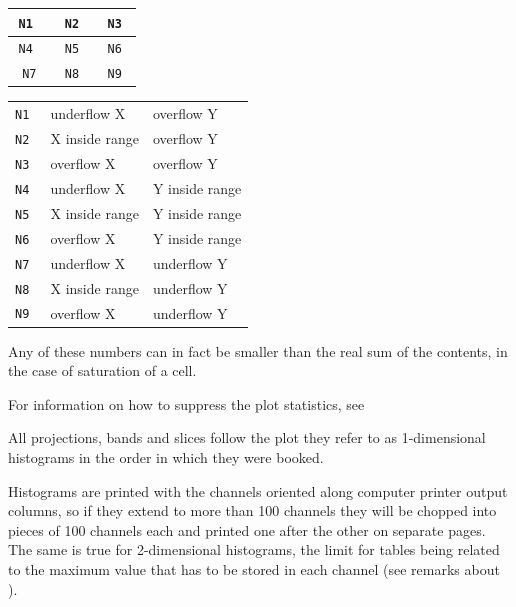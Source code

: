 \begin{minipage}{.44\textwidth}
\def\Rule{\rule[1.5ex]{0cm}{6ex}}
\begin{center}
\begin{tabular}{@{\qquad}>{\tt}c|@{\qquad}>{\tt}c@{\qquad}|>{\tt}c@{\qquad}}
      N1  &   N2   &  N3 \\ \hline
      N4  &   N5   &  N6 \\ \hline
      N7  &   N8   &  N9 
\end{tabular}
\end{center}
\end{minipage}\hfill
\begin{minipage}{.55\textwidth}
\begin{tabular}{>{\tt}l@{\quad=\quad}l@{\quad,\quad}l}
 N1   & underflow X      & overflow Y     \\
 N2   & X inside range   & overflow Y     \\
 N3   & overflow X       & overflow Y     \\
 N4   & underflow X      & Y inside range \\
 N5   & X inside range   & Y inside range \\
 N6   & overflow X       & Y inside range \\
 N7   & underflow X      & underflow Y    \\
 N8   & X inside range   & underflow Y    \\
 N9   & overflow X       & underflow Y    \\
\end{tabular}
\end{minipage}
 
Any of these numbers can in fact be smaller than the real sum
of the contents, in the case of saturation of a cell.
 
For information on how to suppress the plot statistics, see
 
All projections, bands and slices follow the plot they refer
to as
1-dimensional histograms in the order in which they were booked.
 
Histograms are printed with the channels oriented along computer
printer output columns, so if they extend to more than 100 channels
they will be chopped into pieces of 100 channels each and printed one after
the other on separate pages. The same is true for 2-dimensional histograms,
the limit for tables being related to the maximum value that has to
be stored in each channel (see remarks about ).
 
